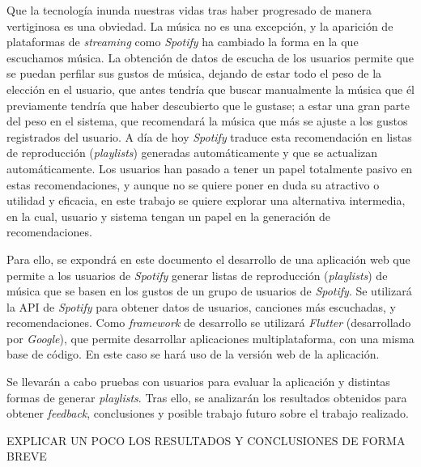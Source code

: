 Que la tecnología inunda nuestras vidas tras haber progresado de manera vertiginosa es una obviedad.
La música no es una excepción, y la aparición de plataformas de \textit{streaming} como \textit{Spotify} ha cambiado la forma en la que escuchamos música.
La obtención de datos de escucha de los usuarios permite que se puedan perfilar sus gustos de música, dejando de estar todo el peso 
de la elección en el usuario, que antes tendría que buscar manualmente la música que él previamente tendría 
que haber descubierto que le gustase; a estar una gran parte del peso en el sistema, que recomendará la música 
que más se ajuste a los gustos registrados del usuario. A día de hoy \textit{Spotify} traduce esta recomendación en listas de reproducción (\textit{playlists})
generadas automáticamente y que se actualizan automáticamente. Los usuarios han pasado a tener un papel totalmente pasivo en estas recomendaciones, y
aunque no se quiere poner en duda su atractivo o utilidad y eficacia, en este trabajo se quiere explorar una alternativa intermedia, en la cual, usuario y sistema
tengan un papel en la generación de recomendaciones.

Para ello, se expondrá en este documento el desarrollo de una aplicación web que permite a los usuarios de \textit{Spotify}
generar listas de reproducción (\textit{playlists}) de música que se basen en los gustos de un grupo de usuarios de \textit{Spotify}. Se utilizará la API de \textit{Spotify}
para obtener datos de usuarios, canciones más escuchadas, y recomendaciones. Como \textit{framework} de desarrollo se utilizará \textit{Flutter} (desarrollado por \textit{Google}), que permite desarrollar aplicaciones
multiplataforma, con una misma base de código. En este caso se hará uso de la versión web de la aplicación.

Se llevarán a cabo pruebas con usuarios para evaluar la aplicación y distintas formas de generar \textit{playlists}. Tras ello, se analizarán los resultados obtenidos para obtener 
\textit{feedback}, conclusiones y posible trabajo futuro sobre el trabajo realizado. 

EXPLICAR UN POCO LOS RESULTADOS Y CONCLUSIONES DE FORMA BREVE

